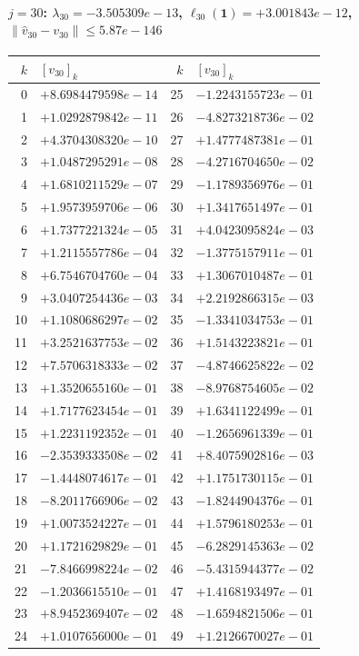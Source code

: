 \documentclass[11pt]{article}
\begin{document}
\paragraph{$j = 30$: $\lambda_{30} = -3.505309e-13$, \quad $\ell_{30}(\mathbf{1}) = +3.001843e-12$, \quad $\|\hat v_{30} - v_{30}\| \leq 5.87e-146$}
\begin{center}
{\footnotesize
\begin{tabular}{r@{\;\;}l@{\quad}r@{\;\;}l}
\toprule
$k$ & $[v_{30}]_k$ & $k$ & $[v_{30}]_k$ \\
\midrule
0 & $+8.6984479598e-14$ & 25 & $-1.2243155723e-01$ \\
1 & $+1.0292879842e-11$ & 26 & $-4.8273218736e-02$ \\
2 & $+4.3704308320e-10$ & 27 & $+1.4777487381e-01$ \\
3 & $+1.0487295291e-08$ & 28 & $-4.2716704650e-02$ \\
4 & $+1.6810211529e-07$ & 29 & $-1.1789356976e-01$ \\
5 & $+1.9573959706e-06$ & 30 & $+1.3417651497e-01$ \\
6 & $+1.7377221324e-05$ & 31 & $+4.0423095824e-03$ \\
7 & $+1.2115557786e-04$ & 32 & $-1.3775157911e-01$ \\
8 & $+6.7546704760e-04$ & 33 & $+1.3067010487e-01$ \\
9 & $+3.0407254436e-03$ & 34 & $+2.2192866315e-03$ \\
10 & $+1.1080686297e-02$ & 35 & $-1.3341034753e-01$ \\
11 & $+3.2521637753e-02$ & 36 & $+1.5143223821e-01$ \\
12 & $+7.5706318333e-02$ & 37 & $-4.8746625822e-02$ \\
13 & $+1.3520655160e-01$ & 38 & $-8.9768754605e-02$ \\
14 & $+1.7177623454e-01$ & 39 & $+1.6341122499e-01$ \\
15 & $+1.2231192352e-01$ & 40 & $-1.2656961339e-01$ \\
16 & $-2.3539333508e-02$ & 41 & $+8.4075902816e-03$ \\
17 & $-1.4448074617e-01$ & 42 & $+1.1751730115e-01$ \\
18 & $-8.2011766906e-02$ & 43 & $-1.8244904376e-01$ \\
19 & $+1.0073524227e-01$ & 44 & $+1.5796180253e-01$ \\
20 & $+1.1721629829e-01$ & 45 & $-6.2829145363e-02$ \\
21 & $-7.8466998224e-02$ & 46 & $-5.4315944377e-02$ \\
22 & $-1.2036615510e-01$ & 47 & $+1.4168193497e-01$ \\
23 & $+8.9452369407e-02$ & 48 & $-1.6594821506e-01$ \\
24 & $+1.0107656000e-01$ & 49 & $+1.2126670027e-01$ \\
\bottomrule
\end{tabular}
}
\end{center}
\end{document}
